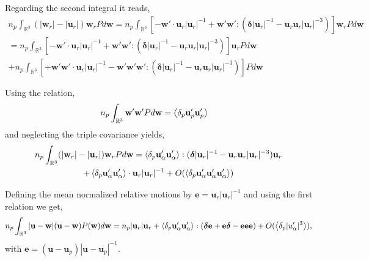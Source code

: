 Regarding the second integral it reads, 
\begin{multline*}
    n_p \int_{\mathbb{R}^3}(|\textbf{w}_r|  - |\textbf{u}_r|) \textbf{w}_r P d\textbf{w} 
    = 
    n_p \int_{\mathbb{R}^3}
    [
    -\textbf{w}' \cdot \textbf{u}_r |\textbf{u}_r|^{-1}
    +\textbf{w}' \textbf{w}' :
    (\bm\delta |\textbf{u}_r|^{-1} - \textbf{u}_r\textbf{u}_r|\textbf{u}_r|^{-3})
    ] \textbf{w}_r P d\textbf{w} \\
    =
    n_p \int_{\mathbb{R}^3}
    [
    -\textbf{w}' \cdot \textbf{u}_r |\textbf{u}_r|^{-1}
    +\textbf{w}' \textbf{w}' :
    (\bm\delta |\textbf{u}_r|^{-1} - \textbf{u}_r\textbf{u}_r|\textbf{u}_r|^{-3})
    ] \textbf{u}_r P d\textbf{w}\\
    +
    n_p \int_{\mathbb{R}^3}
    [
    +\textbf{w}' \textbf{w}' \cdot \textbf{u}_r |\textbf{u}_r|^{-1}
    -\textbf{w}' \textbf{w}' \textbf{w}' :
    (\bm\delta |\textbf{u}_r|^{-1} - \textbf{u}_r\textbf{u}_r|\textbf{u}_r|^{-3})
    ]  P d\textbf{w}
\end{multline*}

Using the relation,
\begin{align*}
    n_p \int_{\mathbb{R}^3}\textbf{w}'\textbf{w}' P d\textbf{w} 
    &=\left<\delta_{p} \textbf{u}_p'\textbf{u}_p'\right>
\end{align*}
and neglecting the triple covariance yields, 
\begin{multline}
    n_p \int_{\mathbb{R}^3}(|\textbf{w}_r|  - |\textbf{u}_r|) \textbf{w}_r P d\textbf{w}
    =
    \left<\delta_{p} \textbf{u}_\alpha'\textbf{u}_\alpha'\right>:
    (\bm\delta |\textbf{u}_r|^{-1} - \textbf{u}_r\textbf{u}_r|\textbf{u}_r|^{-3})
    \textbf{u}_r \\
    +
    \left<\delta_{p} \textbf{u}_\alpha'\textbf{u}_\alpha'\right> \cdot \textbf{u}_r |\textbf{u}_r|^{-1} + O(\left<\delta_{p} \textbf{u}_\alpha'\textbf{u}_\alpha'\textbf{u}_\alpha'\right>)
\end{multline}

Defining the mean normalized relative motions by $\textbf{e} = \textbf{u}_r|\textbf{u}_r|^{-1}$ and using the first relation we get, 
\begin{equation}
    n_p  \int_{\mathbb{R}^3} 
    |\textbf{u}- \textbf{w}| (\textbf{u}-\textbf{w})
    P(\textbf{w})
    d\textbf{w}
    =
    n_p  
    |\textbf{u}_r|\textbf{u}_r + 
    \left<\delta_{p} \textbf{u}_\alpha'\textbf{u}_\alpha'\right>:
    (\bm\delta \textbf{e} +\textbf{e} \bm\delta  - \textbf{eee})
    +O(\left<\delta_{p} |u_\alpha'|^3\right>),
\end{equation}
with $\textbf{e} = (\textbf{u}-\textbf{u}_p)|\textbf{u}- \textbf{u}_p|^{-1}$. 

